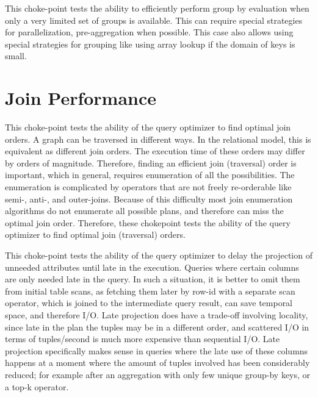 


This choke-point tests the ability to efficiently perform group by evaluation
when only a very limited set of groups is available.  This can require special
strategies for parallelization, \eg pre-aggregation when possible. This case also allows using special strategies for grouping like using array lookup if the domain of keys is small.




\section{Join Performance}


This choke-point tests the ability of the query optimizer to find optimal join orders. A graph can be traversed in different ways. In the relational model, this is equivalent as different join orders.
The execution time of these orders may differ by orders of magnitude. Therefore, finding an efficient join (traversal) order is important, which in general, requires enumeration of all the possibilities.
The enumeration is complicated by operators that are not freely re-orderable like semi-, \mbox{anti-,} and outer-joins. Because of this difficulty most join enumeration algorithms do not enumerate all possible plans, and therefore can miss the optimal join order. Therefore, these chokepoint tests the ability of the query optimizer to find optimal join (traversal) orders.




This choke-point tests the ability of the query optimizer to delay the projection of unneeded attributes until late in the execution. Queries where certain columns are only needed late in the query.
In such a situation, it is better to omit them from initial table scans, as fetching them later by row-id with a separate scan operator, which is joined to the intermediate query result, can save temporal space, and therefore I/O.
Late projection does have a trade-off involving locality, since late in the plan the tuples may be in a different order, and scattered I/O in terms of tuples/second is much more expensive than sequential I/O.
Late projection specifically makes sense in queries where the late use of these columns happens at a moment where the amount of tuples involved has been considerably reduced;
for example after an aggregation with only few unique group-by keys, or a top-k operator.

